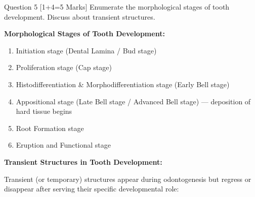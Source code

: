 \documentclass[11pt,a4paper]{article}
\begin{document}
\begin{qbox}{Question 5 [1+4=5 Marks]}
Enumerate the morphological stages of tooth development. Discuss about transient structures.
\end{qbox}

\begin{ansbox}
\textbf{Morphological Stages of Tooth Development:}
\begin{enumerate}[leftmargin=*]
    \item Initiation stage (Dental Lamina / Bud stage)
    \item Proliferation stage (Cap stage)
    \item Histodifferentiation \& Morphodifferentiation stage (Early Bell stage)
    \item Appositional stage (Late Bell stage / Advanced Bell stage) --- deposition of hard tissue begins
    \item Root Formation stage
    \item Eruption and Functional stage
\end{enumerate}

\textbf{Transient Structures in Tooth Development:}

Transient (or temporary) structures appear during odontogenesis but regress or disappear after serving their specific developmental role:


\end{ansbox}
\end{document}
